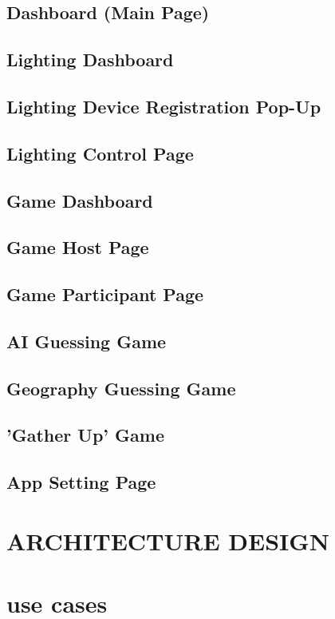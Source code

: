 \documentclass[conference]{IEEEtran}
\begin{document}
\subsection{Dashboard (Main Page)}
\subsection{Lighting Dashboard}
\subsection{Lighting Device Registration Pop-Up}
\subsection{Lighting Control Page}
\subsection{Game Dashboard}
\subsection{Game Host Page}
\subsection{Game Participant Page}
\subsection{AI Guessing Game}
\subsection{Geography Guessing Game}
\subsection{'Gather Up' Game}
\subsection{App Setting Page}

\section{ARCHITECTURE DESIGN}

\section{use cases}
\end{document}
